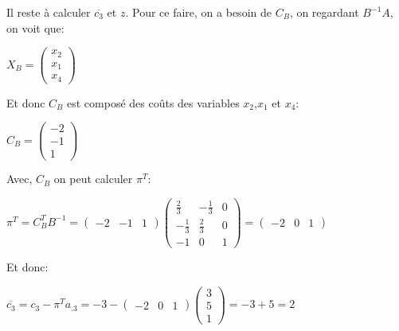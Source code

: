 \documentclass{article}
\begin{document}
\begin{enumerate}
Il reste à calculer $\overline{c_3}$ et $z$. Pour ce faire, on a besoin de $C_B$, on regardant $B^{-1}A$, on voit que:

\begin{center}
\begin{math} 
X_B =
\begin{pmatrix}
x_2\\
x_1\\
x_4
\end{pmatrix}
\end{math}
\end{center}

Et donc $C_B$ est composé des coûts des variables $x_2$,$x_1$ et $x_4$:
\begin{center}
\begin{math}
C_B = 
\begin{pmatrix}
-2\\
-1\\
1
\end{pmatrix}
\end{math}
\end{center}

Avec, $C_B$ on peut calculer $\pi^{T}$:

\begin{center}
\begin{math}
\pi^{T} = C_B^TB^{-1} =
\begin{pmatrix}
-2 & -1 & 1
\end{pmatrix}
\begin{pmatrix}
\frac{2}{3} & -\frac{1}{3} & 0\\[5pt]
-\frac{1}{3} & \frac{2}{3} & 0\\[5pt]
-1 & 0 & 1
\end{pmatrix}
=
\begin{pmatrix}
-2 & 0 & 1
\end{pmatrix}
\end{math}
\end{center}

Et donc:

\begin{center}
\begin{math}
\overline{c_3} = c_3 - \pi^Ta_{.3} = -3 - 
\begin{pmatrix}
-2 & 0 & 1
\end{pmatrix}
\begin{pmatrix}
3\\
5\\
1
\end{pmatrix}
= -3 + 5 = 2
\end{math}
\end{center}


\end{enumerate}
\end{document}

